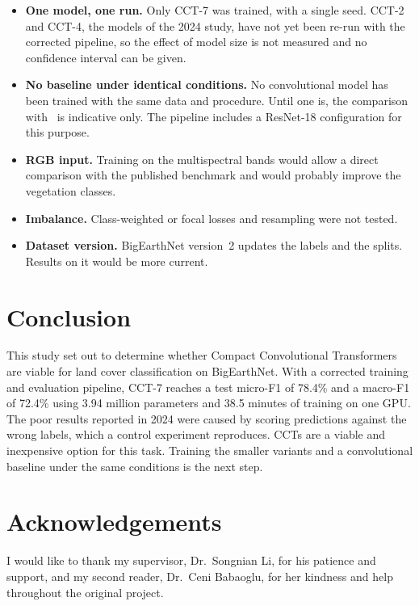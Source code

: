 \documentclass[11pt]{article}
\begin{document}
\begin{itemize}
  \item \textbf{One model, one run.} Only CCT-7 was trained, with a single seed. CCT-2 and CCT-4, the
        models of the 2024 study, have not yet been re-run with the corrected pipeline, so the effect of
        model size is not measured and no confidence interval can be given.
  \item \textbf{No baseline under identical conditions.} No convolutional model has been trained with the
        same data and procedure. Until one is, the comparison with~\cite{papoutsis} is indicative only.
        The pipeline includes a ResNet-18 configuration for this purpose.
  \item \textbf{RGB input.} Training on the multispectral bands would allow a direct comparison with the
        published benchmark and would probably improve the vegetation classes.
  \item \textbf{Imbalance.} Class-weighted or focal losses and resampling were not tested.
  \item \textbf{Dataset version.} BigEarthNet version~2 updates the labels and the splits.
        Results on it would be more current.
\end{itemize}

\section{Conclusion}

This study set out to determine whether Compact Convolutional Transformers are viable for land cover
classification on BigEarthNet. With a corrected training and evaluation pipeline, CCT-7 reaches a test
micro-F1 of 78.4\% and a macro-F1 of 72.4\% using 3.94 million parameters and 38.5 minutes of training on
one GPU. The poor results reported in 2024 were caused by scoring predictions against the wrong labels,
which a control experiment reproduces. CCTs are a viable and inexpensive option for this task. Training
the smaller variants and a convolutional baseline under the same conditions is the next step.

\section*{Acknowledgements}

I would like to thank my supervisor, Dr.\ Songnian Li, for his patience and support, and my second
reader, Dr.\ Ceni Babaoglu, for her kindness and help throughout the original project.
\end{document}
